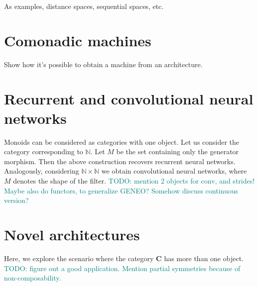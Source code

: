 \documentclass[12pt]{article}
\newcommand{\pietro}[1]{\textcolor{teal}{#1}}
\newcommand{\Cat}{{\mathbf{C}}}
\begin{document}
As examples, distance spaces, sequential spaces, etc.

\section{Comonadic machines}

Show how it's possible to obtain a machine from an architecture.

\section{Recurrent and convolutional neural networks}

Monoids can be considered as categories with one object. Let us consider the category corresponding to $\mathbb N$. Let $M$ be the set containing only the generator morphism. Then the above construction recovers recurrent neural networks. Analogously, considering $\mathbb N \times \mathbb N$ we obtain convolutional neural networks, where $M$ denotes the shape of the filter.
\pietro{TODO: mention 2 objects for conv, and strides!}
\pietro{Maybe also do functors, to generalize GENEO? Somehow discuss continuous version?}

\section{Novel architectures}

Here, we explore the scenario where the category $\Cat$ has more than one object.
\pietro{TODO: figure out a good application.}
\pietro{Mention partial symmetries because of non-composability.}



\end{document}
